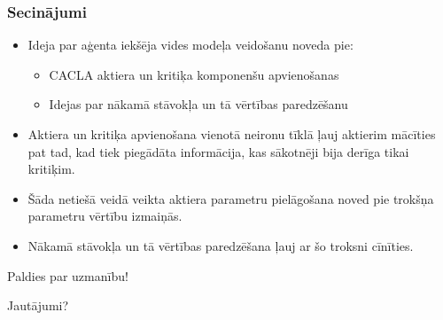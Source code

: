 \documentclass[xetex,mathserif]{beamer}
\begin{document}
  \begin{frame}
    \frametitle{Secinājumi}
      \begin{itemize}
        \item Ideja par aģenta iekšēja vides modeļa veidošanu noveda pie:
          \begin{itemize}
            \item CACLA aktiera un kritiķa komponenšu apvienošanas
            \item Idejas par nākamā stāvokļa un tā vērtības paredzēšanu
          \end{itemize}
        \item Aktiera un kritiķa apvienošana vienotā neironu tīklā ļauj aktierim
          mācīties pat tad, kad tiek piegādāta informācija, kas sākotnēji bija
          derīga tikai kritiķim.
        \item Šāda netiešā veidā veikta aktiera parametru pielāgošana noved pie
          trokšņa parametru vērtību izmaiņās.
        \item Nākamā stāvokļa un tā vērtības paredzēšana ļauj ar šo troksni
          cīnīties.
      \end{itemize}
  \end{frame}
  
  \begin{frame}
    \begin{center}
    \huge{Paldies par uzmanību!}

    \vspace{0.5cm}
    \normalsize{Jautājumi?}
    \end{center}
  \end{frame}

\end{document}
